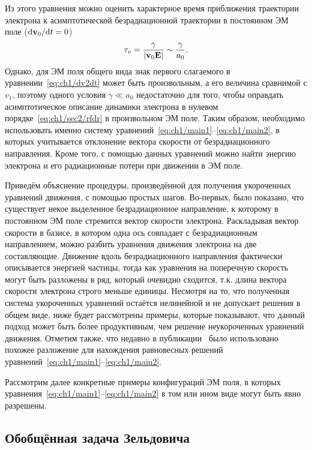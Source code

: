Из этого уравнения можно оценить характерное время приближения траектории электрона к асимптотической безрадиационной траектории в постоянном ЭМ поле ($\dd\vb{v}_0/\dd t = 0$)
\begin{equation}
    \tau_v = \frac{\gamma}{|\vb{v}_0 \vb{E}|} \sim \frac{\gamma}{a_0}.
\end{equation}
Однако, для ЭМ поля общего вида знак первого слагаемого в уравнении~\eqref{eq:ch1/dv2dt} может быть произвольным, а его величина сравнимой с $v_1$, поэтому одного условия $\gamma \ll a_0$ недостаточно для того, чтобы оправдать асимптотическое описание динамики электрона в нулевом порядке~\eqref{eq:ch1/sec2/rfdr} в произвольном ЭМ поле.
Таким образом, необходимо использовать именно систему уравнений~\eqref{eq:ch1/main1}--\eqref{eq:ch1/main2}, в которых учитывается отклонение вектора скорости от безрадиационного направления.
Кроме того, с помощью данных уравнений можно найти энергию электрона и его радиационные потери при движении в ЭМ поле.

Приведём объяснение процедуры, произведённой для получения укороченных уравнений движения, с помощью простых шагов.
Во-первых, было показано, что существует некое выделенное безрадиационное направление, к которому в постоянном ЭМ поле стремится вектор скорости электрона.
Раскладывая вектор скорости в базисе, в котором одна ось совпадает с безрадиационным направлением, можно разбить уравнения движения электрона на две составляющие.
Движение вдоль безрадиационного направления фактически описывается энергией частицы, тогда как уравнения на поперечную скорость могут быть разложены в ряд, который очевидно сходится, т.к. длина вектора скорости электрона строго меньше единицы.
Несмотря на то, что полученная система укороченных уравнений остаётся нелинейной и не допускает решения в общем виде, ниже будет рассмотрены примеры, которые показывают, что данный подход может быть более продуктивным, чем решение неукороченных уравнений движения.
Отметим также, что недавно в публикации~\cite{cai2022dynamics} было использовано похожее разложение для нахождения равновесных решений уравнений~\eqref{eq:ch1/main1}--\eqref{eq:ch1/main2}.

Рассмотрим далее конкретные примеры конфигураций ЭМ поля, в которых уравнения~\eqref{eq:ch1/main1}--\eqref{eq:ch1/main2} в том или ином виде могут быть явно разрешены.

\subsection{Обобщённая задача Зельдовича}
\label{sub:ch1/sec4/Zeldovich}


